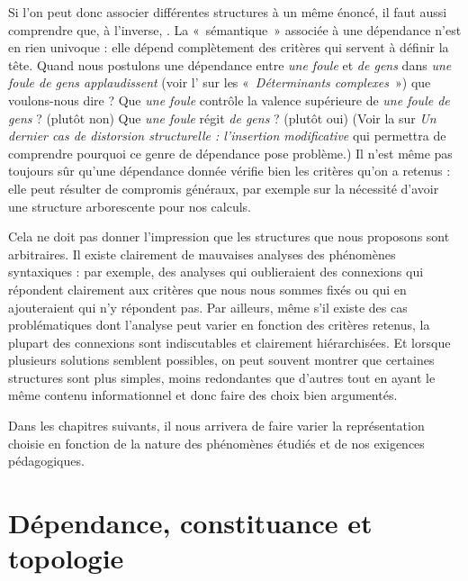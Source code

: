Si l’on peut donc associer différentes structures à un même énoncé, il faut aussi comprendre que, à l’inverse, . La «~sémantique~» associée à une dépendance n’est en rien univoque : elle dépend complètement des critères qui servent à définir la tête. Quand nous postulons une dépendance entre \textit{une foule} et \textit{de gens} dans \textit{une foule de gens applaudissent} (voir l’ sur les «~\textit{Déterminants complexes}~») que voulons-nous dire ? Que \textit{une foule} contrôle la valence supérieure de \textit{une foule de gens} ? (plutôt non) Que \textit{une foule} régit \textit{de gens} ? (plutôt oui) (Voir la  sur \textit{Un dernier cas de distorsion structurelle : l’insertion modificative} qui permettra de comprendre pourquoi ce genre de dépendance pose problème.) Il n’est même pas toujours sûr qu’une dépendance donnée vérifie bien les critères qu’on a retenus : elle peut résulter de compromis généraux, par exemple sur la nécessité d’avoir une structure arborescente pour nos calculs.

\begin{sloppypar}
Cela ne doit pas donner l’impression que les structures que nous proposons sont arbitraires. Il existe clairement de mauvaises analyses des phénomènes syntaxiques : par exemple, des analyses qui oublieraient des connexions qui répondent clairement aux critères que nous nous sommes fixés ou qui en ajouteraient qui n’y répondent pas. Par ailleurs, même s’il existe des cas problématiques dont l’analyse peut varier en fonction des critères retenus, la plupart des connexions sont indiscutables et clairement hiérarchisées. Et lorsque plusieurs solutions sem\-blent possibles, on peut souvent montrer que certaines structures sont plus simples, moins redondantes que d’autres tout en ayant le même contenu informationnel et donc faire des choix bien argumentés.
\end{sloppypar}

Dans les chapitres suivants, il nous arrivera de faire varier la représentation choisie en fonction de la nature des phénomènes étudiés et de nos exigences pédagogiques.

\section{Dépendance, constituance et topologie}\label{sec:3.3.34}

